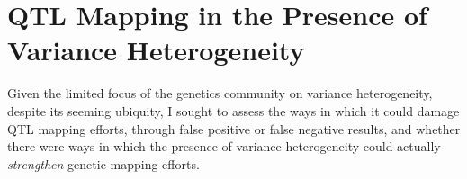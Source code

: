 








\section{QTL Mapping in the Presence of Variance Heterogeneity}

Given the limited focus of the genetics community on variance heterogeneity, despite its seeming ubiquity, I sought to assess the ways in which it could damage QTL mapping efforts, through false positive or false negative results, and whether there were ways in which the presence of variance heterogeneity could actually \textit{strengthen} genetic mapping efforts.

